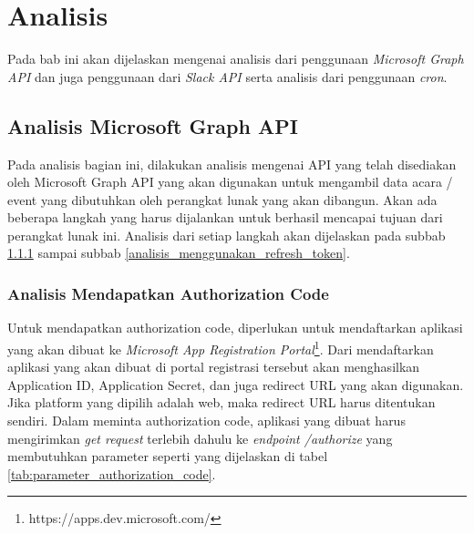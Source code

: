 \chapter{Analisis}
\label{chap:analisis}

Pada bab ini akan dijelaskan mengenai analisis dari penggunaan \textit{Microsoft Graph API} dan juga penggunaan dari \textit{Slack API} serta analisis dari penggunaan \textit{cron}. 

\section{Analisis Microsoft Graph API}
\label{sec:analisis_microsoft_graph_api}

Pada analisis bagian ini, dilakukan analisis mengenai API yang telah disediakan oleh Microsoft Graph API yang akan digunakan untuk mengambil data acara / event yang dibutuhkan oleh perangkat lunak yang akan dibangun. Akan ada beberapa langkah yang harus dijalankan untuk berhasil mencapai tujuan dari perangkat lunak ini. Analisis dari setiap langkah akan dijelaskan pada subbab \ref{analisis_authorization_code} sampai subbab \ref{analisis_menggunakan_refresh_token}.

\subsection{Analisis Mendapatkan Authorization Code}
\label{analisis_authorization_code}
Untuk mendapatkan authorization code, diperlukan untuk mendaftarkan aplikasi yang akan dibuat ke \textit{Microsoft App Registration Portal}\footnote{https://apps.dev.microsoft.com/}. Dari mendaftarkan aplikasi yang akan dibuat di portal registrasi tersebut akan menghasilkan Application ID, Application Secret, dan juga redirect URL yang akan digunakan. Jika platform yang dipilih adalah web, maka redirect URL harus ditentukan sendiri. Dalam meminta authorization code, aplikasi yang dibuat harus mengirimkan \textit{get request} terlebih dahulu ke \textit{endpoint /authorize} yang membutuhkan parameter seperti yang dijelaskan di tabel \ref{tab:parameter_authorization_code}. 

